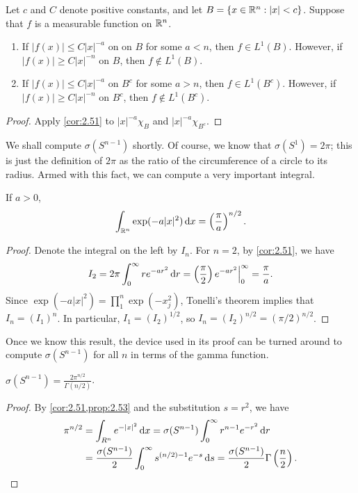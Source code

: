 \documentclass[12pt]{article} %
\begin{document}
\begin{corollary}
    Let $c$ and $C$ denote positive constants, and let $B = \{x \in \mathbb{R}^n : |x| < c\}$. Suppose that $f$ is a measurable function on $\mathbb{R}^n$. \begin{enumerate}
        \item If $|f(x)| \leq C|x|^{-a}$ on on $B$ for some $a < n$, then $f \in L^1(B)$. However, if $|f(x)| \geq C|x|^{-n}$ on $B$, then $f \notin L^1(B)$.
        \item If $|f(x)| \leq C|x|^{-a}$ on $B^c$ for some $a > n$, then $f \in L^1(B^c)$. However, if $|f(x)| \geq C|x|^{-n}$ on $B^c$, then $f \notin L^1(B^c)$.
    \end{enumerate}
\end{corollary}

\begin{proof}
    Apply \cref{cor:2.51} to $|x|^{-a}\chi_B$ and $|x|^{-a}\chi_{B^c}$.
\end{proof}

We shall compute $\sigma(S^{n-1})$ shortly. Of course, we know that $\sigma(S^1) = 2\pi$; this is just the definition of $2 \pi$ as the ratio of the circumference of a circle to its radius. Armed with this fact, we can compute a very important integral.

\begin{proposition}\label{prop:2.53}
    If $a > 0$, \[\int_{\mathbb{R}^n} \exp(-a|x|^2)\, \mathrm{d} x = \left(\frac{\pi}{a}\right)^{n/2}.\]
\end{proposition}

\begin{proof}
    Denote the integral on the left by $I_n$. For $n = 2$, by \cref{cor:2.51}, we have \[I_2 = 2\pi \int_0^\infty re^{-ar^2}\, \mathrm{d} r = \left(\frac{\pi}{2}\right) e^{-ar^2} \Big|_0^\infty = \frac{\pi}{a}.\] Since $\exp(-a|x|^2) = \prod_1^n \exp(-x_j^2)$, Tonelli's theorem implies that $I_n = (I_1)^n$. In particular, $I_1 = (I_2)^{1/2}$, so $I_n = (I_2)^{n/2} = (\pi/2)^{n/2}$.
\end{proof}

Once we know this result, the device used in its proof can be turned around to compute $\sigma(S^{n-1})$ for all $n$ in terms of the gamma function.

\begin{proposition}
    $\sigma(S^{n-1}) = \frac{2\pi^{n/2}}{\Gamma(n/2)}$.
\end{proposition}

\begin{proof}
    By \cref{cor:2.51,prop:2.53} and the substitution $s = r^2$, we have \begin{align*}
        \pi^{n/2} &= \int_{R^n} e^{-|x|^2} \, \mathrm{d} x = \sigma(S^{n-1}) \int_0^\infty r^{n-1} e^{-r^2} \, \mathrm{d} r\\
        &= \frac{\sigma(S^{n-1})}{2} \int_0^\infty s^{(n/2) - 1}e^{-s} \, \mathrm{d} s = \frac{\sigma(S^{n-1})}{2} \Gamma\left(\frac{n}{2}\right).
    \end{align*}
\end{proof}
\end{document}
